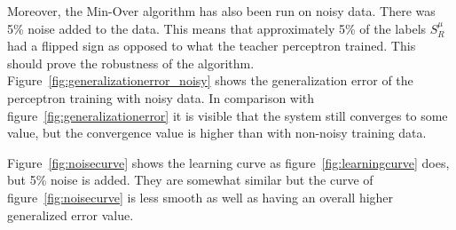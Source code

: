 Moreover, the Min-Over algorithm has also been run on noisy data. There was 5\% noise added to the data. This means that approximately 5\% of the labels $S^{\mu}_R$ had a flipped sign as opposed to what the teacher perceptron trained. This should prove the robustness of the algorithm.
Figure~\ref{fig:generalizationerror_noisy} shows the generalization error of the perceptron training with noisy data. In comparison with figure~\ref{fig:generalizationerror} it is visible that the system still converges to some value, but the convergence value is higher than with non-noisy training data. 

Figure~\ref{fig:noisecurve} shows the learning curve as figure~\ref{fig:learningcurve} does, but 5\% noise is added. They are somewhat similar but the curve of figure~\ref{fig:noisecurve} is less smooth as well as having an overall higher generalized error value.